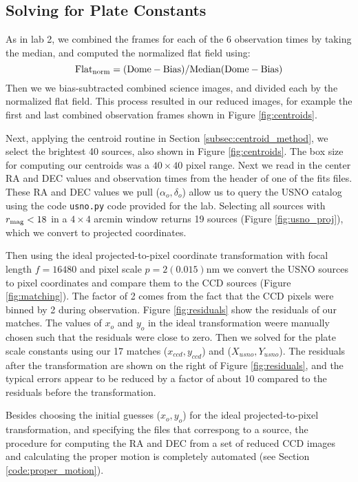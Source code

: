 \documentclass[preprint]{aastex62}
\begin{document}
\subsection{Solving for Plate Constants}
As in lab 2, we combined the frames for each of the 6 observation times by taking the median, and computed the normalized flat field using:
\begin{equation}
    {\rm Flat_{norm} = (Dome - Bias)/Median(Dome - Bias)} 
\end{equation}
Then we we bias-subtracted combined science images, and divided each by the normalized flat field. This process resulted in our reduced images, for example the first and last combined observation frames shown in Figure \ref{fig:centroids}.

Next, applying the centroid routine in Section \ref{subsec:centroid_method}, we select the brightest 40 sources, also shown in Figure \ref{fig:centroids}. The box size for computing our centroids was a $40\times40$ pixel range. Next we read in the center RA and DEC values and observation times from the header of one of the fits files. These RA and DEC values we pull ($\alpha_o, \delta_o$) allow us to query the USNO catalog using the code {\tt usno.py} code provided for the lab. Selecting all sources with $r_{\rm mag} < 18$ in a $4\times4$ arcmin window returns 19 sources (Figure \ref{fig:usno_proj}), which we convert to projected coordinates.

Then using the ideal projected-to-pixel coordinate transformation with focal length $f=16480$ and pixel scale $p=2(0.015)$nm we convert the USNO sources to pixel coordinates and compare them to the CCD sources (Figure \ref{fig:matching}). The factor of 2 comes from the fact that the CCD pixels were binned by 2 during observation. Figure \ref{fig:residuals} show the residuals of our matches. The values of $x_o$ and $y_o$ in the ideal transformation weere manually chosen such that the residuals were close to zero. Then we solved for the plate scale constants using our 17 matches ($x_{ccd},y_{ccd}$) and ($X_{usno}, Y_{usno}$). The residuals after the transformation are shown on the right of Figure \ref{fig:residuals}, and the typical errors appear to be reduced by a factor of about 10 compared to the residuals before the transformation.

Besides choosing the initial guesses ($x_o, y_o$) for the ideal projected-to-pixel transformation, and specifying the files that correspong to a source, the procedure for computing the RA and DEC from a set of reduced CCD images and calculating the proper motion is completely automated (see Section \ref{code:proper_motion}).
\end{document}
